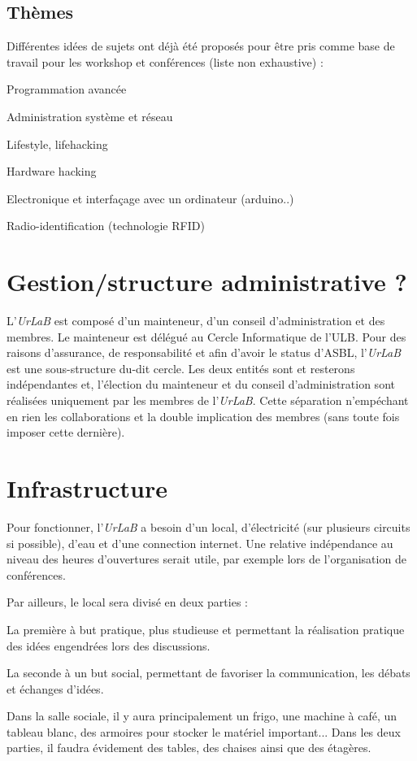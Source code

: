 \documentclass[a4paper]{article}
\begin{document}
         \subsection*{Thèmes} %
Différentes  idées de sujets ont déjà été proposés pour être pris comme base de  travail pour les workshop et conférences (liste non exhaustive) : 
\begin{list}{-}{}
\item Programmation avancée
\item Administration système et réseau
\item Lifestyle, lifehacking
\item Hardware hacking
\item Electronique et interfaçage avec un ordinateur (arduino..) 
\item Radio-identification (technologie RFID)
\end{list}


\section{Gestion/structure administrative ?} %
L’\emph{UrLaB}  est composé d’un mainteneur, d’un conseil d’administration et des  membres. Le mainteneur est délégué au Cercle Informatique de l’ULB.
Pour  des raisons d’assurance, de responsabilité et afin d’avoir le status  d’ASBL, l’\emph{UrLaB} est une sous-structure du-dit cercle. 
Les  deux entités sont et resterons indépendantes et, l’élection du  mainteneur et du conseil d’administration sont réalisées uniquement  par les membres de l’\emph{UrLaB}. Cette séparation n\rq{}empéchant en  rien les collaborations et la double implication des membres (sans toute  fois imposer cette dernière).


\section{Infrastructure}
Pour  fonctionner, l’\emph{UrLaB} a besoin d’un local, d’électricité (sur  plusieurs circuits si possible), d’eau et d’une connection internet. Une  relative indépendance au niveau des heures d’ouvertures serait utile,  par exemple lors de l’organisation de conférences.
\begin{list}{-}{} Par ailleurs, le local sera divisé en deux parties :
\item  La première à but pratique, plus studieuse et permettant la  réalisation pratique des idées engendrées lors des discussions. 
\item La seconde à un but social, permettant de favoriser la communication, les débats et échanges d’idées.
\end{list}
Dans  la salle sociale, il y aura principalement un frigo, une machine à  café, un tableau blanc, des armoires pour stocker le matériel  important... 
Dans les deux parties, il faudra évidement des tables, des chaises ainsi que des étagères.
\end{document}
